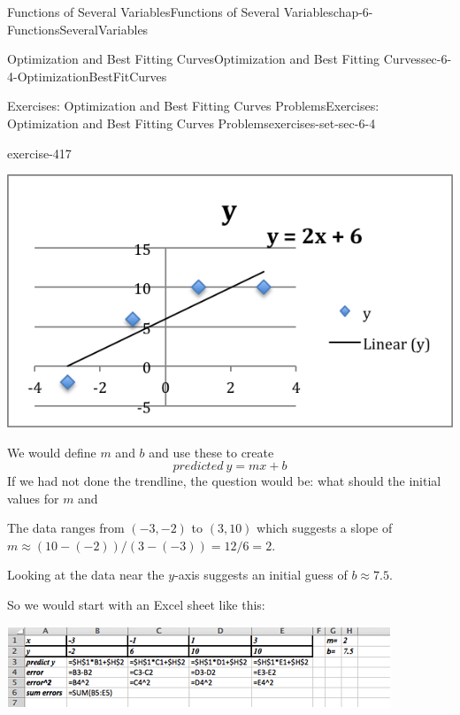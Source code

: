 \documentclass[oneside,10pt,]{book}
\numberwithin{equation}{section}
\begin{document}
\begin{chapterptx}{Functions of Several Variables}{}{Functions of Several Variables}{}{}{chap-6-FunctionsSeveralVariables}
\begin{sectionptx}{Optimization and Best Fitting Curves}{}{Optimization and Best Fitting Curves}{}{}{sec-6-4-OptimizationBestFitCurves}
\begin{exercises-subsection-numberless}{Exercises: Optimization and Best Fitting Curves Problems}{}{Exercises: Optimization and Best Fitting Curves Problems}{}{}{exercises-set-sec-6-4}
\begin{divisionexercise}{3}{}{}{exercise-417}
\begin{sidebyside}{1}{0.2}{0.2}{0}
\begin{sbspanel}{0.6}%
\includegraphics[width=1\linewidth]{images/sec6-4-sol3a.png}
\end{sbspanel}%
\end{sidebyside}%
\par
\hypertarget{p-2495}{}%
We would define \(m\) and \(b\) and use these to create%
%
\begin{equation*}
predicted\ y=mx+b
\end{equation*}
\hypertarget{p-2496}{}%
If we had not done the trendline, the question would be: what should the initial values for \(m\) and%
\par
\hypertarget{p-2497}{}%
The data ranges from \((-3,-2)\) to \((3,10)\) which suggests a slope of \(m\approx (10-(-2))/(3-(-3) )=12/6=2\).%
\par
\hypertarget{p-2498}{}%
Looking at the data near the \(y\)-axis suggests an initial guess of \(b\approx 7.5\).%
\par
\hypertarget{p-2499}{}%
So we would start with an Excel sheet like this:%
\begin{sidebyside}{1}{0}{0}{0}%
\begin{sbspanel}{1}%
\includegraphics[width=1\linewidth]{images/sec6-4-sol3b.png}
\end{sbspanel}%
\end{sidebyside}%
\begin{sidebyside}{1}{0}{0}{0}%
\begin{sbspanel}{1}%

\end{sbspanel}
\end{sidebyside}
\end{divisionexercise}
\end{exercises-subsection-numberless}
\end{sectionptx}
\end{chapterptx}
\end{document}
